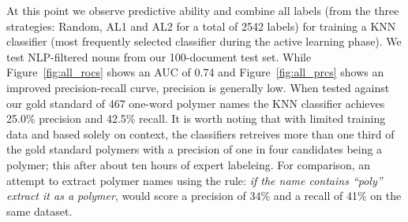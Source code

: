 At this point we observe predictive ability and combine all labels (from the three strategies: Random, AL1 and AL2 for a total of 2542 labels) for training a KNN classifier (most frequently selected classifier during the active learning phase).
We test NLP-filtered nouns from our 100-document test set.
While Figure~\ref{fig:all_rocs} shows an AUC of 0.74 and Figure~\ref{fig:all_prcs} shows an improved precision-recall curve, precision is generally low.
When tested against our gold standard of 467 one-word polymer names the KNN classifier achieves 25.0\% precision and  42.5\% recall.	
It is worth noting that with limited training data and based solely on context, the classifiers retreives more than one third of the gold standard polymers with a precision of one in four candidates being a polymer; this after about ten hours of expert labeleing. 
For comparison, an attempt to extract polymer names using the rule: \textit{if the name contains ``poly'' extract it as a polymer}, would score a precision of 34\% and a recall of 41\% on the same dataset. %

